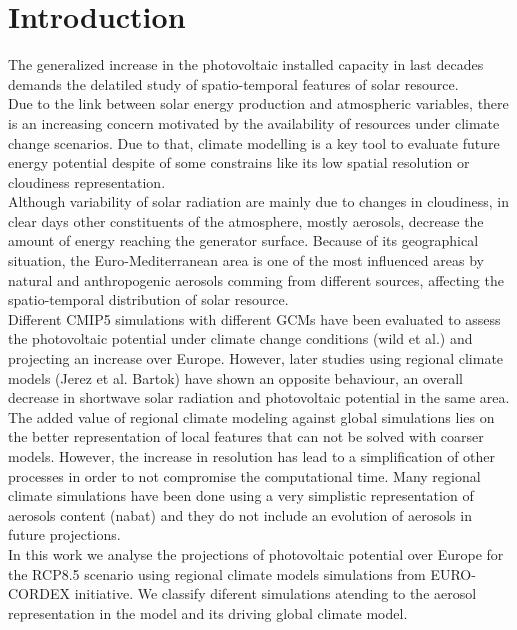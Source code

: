 \section{Introduction}

    The generalized increase in the photovoltaic installed capacity in last decades demands the delatiled study of spatio-temporal features of solar resource.\\

  Due to the link between solar energy production and atmospheric variables, there is an increasing concern motivated by the availability of resources under climate change scenarios. Due to that, climate modelling is a key tool to evaluate future energy potential despite of some constrains like its low spatial resolution or cloudiness representation.\\
  
   Although variability of solar radiation are mainly due to changes in cloudiness, in clear days other constituents of the atmosphere, mostly aerosols, decrease the amount of energy reaching the generator surface. Because of its geographical situation, the Euro-Mediterranean area is one of the most influenced areas by natural and anthropogenic aerosols comming from different sources, affecting the spatio-temporal distribution of solar resource.\\

   Different CMIP5 simulations with different GCMs have been evaluated to assess the photovoltaic potential under climate change conditions (wild et al.) and projecting an increase over Europe. However, later studies using regional climate models (Jerez et al. Bartok) have shown an opposite behaviour, an overall decrease in shortwave solar radiation and photovoltaic potential in the same area.\\

   The added value of regional climate modeling against global simulations lies on the better representation of local features that can not be solved with coarser models. However, the increase in resolution has lead to a simplification of other processes in order to not compromise the computational time. Many regional climate simulations have been done using a very simplistic representation of aerosols content (nabat) and they do not include an evolution of aerosols in future projections.\\
   
   In this work we analyse the projections of photovoltaic potential over Europe for the RCP8.5 scenario using regional climate models simulations from EURO-CORDEX initiative. We classify diferent simulations atending to the aerosol representation in the model and its driving global climate model.\\

